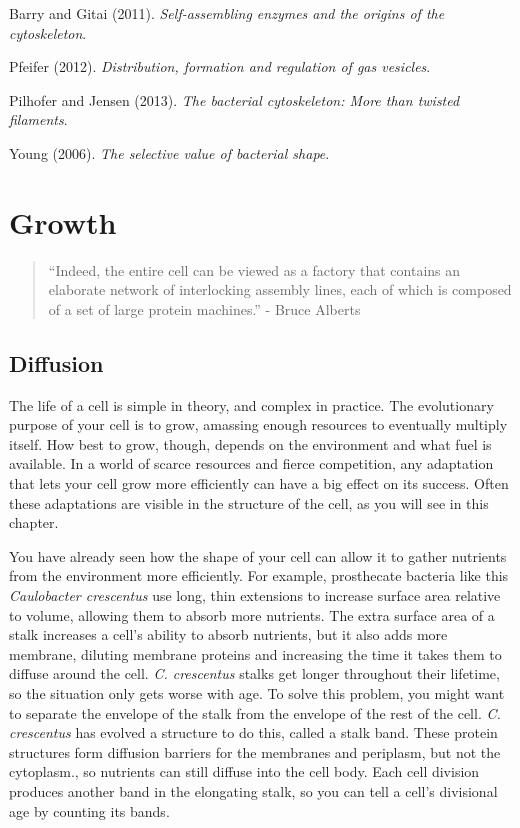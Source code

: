\documentclass[]{tufte-book}
\begin{document}
Barry and Gitai (2011). \emph{Self-assembling enzymes and the origins of
the cytoskeleton}.\citep{barry2011}

Pfeifer (2012). \emph{Distribution, formation and regulation of gas
vesicles}.\citep{pfeifer2012}

Pilhofer and Jensen (2013). \emph{The bacterial cytoskeleton: More than
twisted filaments}.\citep{pilhofer2013}

Young (2006). \emph{The selective value of bacterial
shape}.\citep{young2006}

\chapter{Growth}\label{growth}

\begin{quote}
``Indeed, the entire cell can be viewed as a factory that contains an
elaborate network of interlocking assembly lines, each of which is
composed of a set of large protein machines.'' - Bruce Alberts
\citep{alberts1998}
\end{quote}

\section{Diffusion}\label{diffusion}

The life of a cell is simple in theory, and complex in practice. The
evolutionary purpose of your cell is to grow, amassing enough resources
to eventually multiply itself. How best to grow, though, depends on the
environment and what fuel is available. In a world of scarce resources
and fierce competition, any adaptation that lets your cell grow more
efficiently can have a big effect on its success. Often these
adaptations are visible in the structure of the cell, as you will see in
this chapter.

You have already seen how the shape of your cell can allow it to gather
nutrients from the environment more efficiently. For example,
prosthecate bacteria like this \emph{Caulobacter crescentus} use long,
thin extensions to increase surface area relative to volume, allowing
them to absorb more nutrients. The extra surface area of a stalk
increases a cell's ability to absorb nutrients, but it also adds more
membrane, diluting membrane proteins and increasing the time it takes
them to diffuse around the cell. \emph{C. crescentus} stalks get longer
throughout their lifetime, so the situation only gets worse with age. To
solve this problem, you might want to separate the envelope of the stalk
from the envelope of the rest of the cell. \emph{C. crescentus} has
evolved a structure to do this, called a stalk band. These protein
structures form diffusion barriers for the membranes and periplasm, but
not the cytoplasm., so nutrients can still diffuse into the cell body.
Each cell division produces another band in the elongating stalk, so you
can tell a cell's divisional age by counting its bands.
\end{document}
